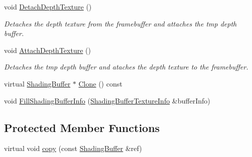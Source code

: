 \begin{DoxyCompactItemize}
void \mbox{\hyperlink{class_geometry_engine_1_1_geometry_buffer_1_1_shading_buffer_af1ad5bf164f69282807959bbeaf2e975}{Detach\+Depth\+Texture}} ()
\begin{DoxyCompactList}\small\item\em Detaches the depth texture from the framebuffer and attaches the tmp depth buffer. \end{DoxyCompactList}\item 
\mbox{\label{class_geometry_engine_1_1_geometry_buffer_1_1_shading_buffer_ae9d73208781745650fe461168ca8870c}} 
void \mbox{\hyperlink{class_geometry_engine_1_1_geometry_buffer_1_1_shading_buffer_ae9d73208781745650fe461168ca8870c}{Attach\+Depth\+Texture}} ()
\begin{DoxyCompactList}\small\item\em Detaches the tmp depth buffer and ataches the depth texture to the framebuffer. \end{DoxyCompactList}\item 
virtual \mbox{\hyperlink{class_geometry_engine_1_1_geometry_buffer_1_1_shading_buffer}{Shading\+Buffer}} $\ast$ \mbox{\hyperlink{class_geometry_engine_1_1_geometry_buffer_1_1_shading_buffer_a608f7a6fbde69056a268fac83caecfab}{Clone}} () const
\item 
void \mbox{\hyperlink{class_geometry_engine_1_1_geometry_buffer_1_1_shading_buffer_a572f4e882695cc97ec4cba7946093d52}{Fill\+Shading\+Buffer\+Info}} (\mbox{\hyperlink{class_geometry_engine_1_1_shading_buffer_texture_info}{Shading\+Buffer\+Texture\+Info}} \&buffer\+Info)
\end{DoxyCompactItemize}
\subsection*{Protected Member Functions}
\begin{DoxyCompactItemize}
\item 
virtual void \mbox{\hyperlink{class_geometry_engine_1_1_geometry_buffer_1_1_shading_buffer_ac729c279a19db3d12a5be39aff5e2df1}{copy}} (const \mbox{\hyperlink{class_geometry_engine_1_1_geometry_buffer_1_1_shading_buffer}{Shading\+Buffer}} \&ref)
\end{DoxyCompactItemize}
